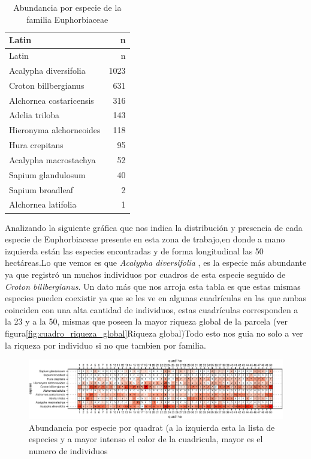 \documentclass[11pt,]{article}
\begin{document}
\begin{longtable}[]{@{}lr@{}}
\caption{\label{tab:tabla_de_abundancia}Abundancia por especie de la
familia Euphorbiaceae}\tabularnewline
\toprule
Latin & n\tabularnewline
\midrule
\endfirsthead
\toprule
Latin & n\tabularnewline
\midrule
\endhead
Acalypha diversifolia & 1023\tabularnewline
Croton billbergianus & 631\tabularnewline
Alchornea costaricensis & 316\tabularnewline
Adelia triloba & 143\tabularnewline
Hieronyma alchorneoides & 118\tabularnewline
Hura crepitans & 95\tabularnewline
Acalypha macrostachya & 52\tabularnewline
Sapium glandulosum & 40\tabularnewline
Sapium broadleaf & 2\tabularnewline
Alchornea latifolia & 1\tabularnewline
\bottomrule
\end{longtable}

Analizando la siguiente gráfica que nos indica la distribución y
presencia de cada especie de Euphorbiaceae presente en esta zona de
trabajo,en donde a mano izquierda están las especies encontradas y de
forma longitudinal las 50 hectáreas.Lo que vemos es que \emph{Acalypha
diversifolia} , es la especie más abundante ya que registró un muchos
individuos por cuadros de esta especie seguido de \emph{Croton
billbergianus}. Un dato más que nos arroja esta tabla es que estas
mismas especies pueden coexistir ya que se les ve en algunas cuadrículas
en las que ambas coinciden con una alta cantidad de individuos, estas
cuadrículas corresponden a la 23 y a la 50, mismas que poseen la mayor
riqueza global de la parcela (ver
figura\ref{fig:cuadro_riqueza_global}Riqueza global)Todo esto nos guia
no solo a ver la riqueza por individuo si no que tambien por familia.

\begin{figure}
\centering
\includegraphics{manuscrito_files/figure-latex/unnamed-chunk-3-1.pdf}
\caption{\label{fig:abun_sp_q}Abundancia por especie por quadrat (a la
izquierda esta la lista de especies y a mayor intenso el color de la
cuadricula, mayor es el numero de individuos}
\end{figure}
\end{document}
